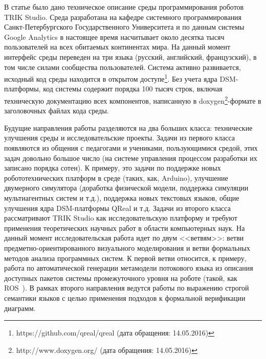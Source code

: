 \documentclass[conference]{IEEEtran}
\begin{document}
В статье было дано техническое описание среды программирования роботов TRIK Studio. Среда разработана на кафедре системного программирования Санкт-Петербургского Государственного Университета и по данным системы Google Analytics в настоящее время насчитывает около десятка тысяч пользователей на всех обитаемых континентах мира. На данный момент интерфейс среды переведен на три языка (русский, английский, французский), в том числе силами сообщества пользователей. Система активно развивается, исходный код среды находится в открытом доступе\footnote{https://github.com/qreal/qreal (дата обращения: 14.05.2016)}. Без учета ядра DSM-платформы, код системы содержит порядка 100 тысяч строк, включая техническую документацию всех компонентов, написанную в doxygen\footnote{http://www.doxygen.org/ (дата обращения: 14.05.2016)}-формате в заголовочных файлах кода среды.

Будущие направления работы разделяются на два больших класса: технические улучшения среды и исследовательские проекты. Задачи из первого класса появляются из общения с педагогами и учениками, пользующимися средой, этих задач довольно большое число (на системе управления процессом разработки их записано порядка сотен). К примеру, это задачи по поддержке новых робототехнических платформ в среде (таких, как, Arduino), улучшение двумерного симулятора (доработка физической модели, поддержка симуляции мультиагентных систем и т.д.), поддержка новых текстовых языков, общие улучшения ядра DSM-платформы QReal и т.д. Задачи из второго класса рассматривают TRIK Studio как исследовательскую платформу и требуют применения теоретических научных работ в области компьютерных наук. На данный момент исследовательская работа идет по двум <<ветвям>>: ветви предметно-ориентированного визуального моделирования и ветви формальных методов анализа программных систем. К первой ветви относится, к примеру, работа по автоматической генерации метамодели потокового языка из описания доступных пакетов системы промежуточного уровня на роботе (такой, как ROS~\cite{quigley2009ros}). В рамках второго направления ведутся работы по выражению строгой семантики языков с целью применения подходов к формальной верификации диаграмм.



\end{document}
